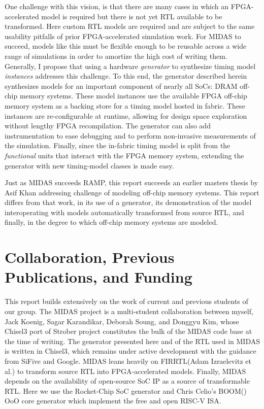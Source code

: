 One challenge with this vision, is that there are many cases in which an
FPGA-accelerated model is required but there is not yet RTL available to be
transformed. Here custom RTL models are required and are subject to the same
usability pitfalls of prior FPGA-accelerated simulation work. For MIDAS to
succeed, models like this must be flexible enough to be reusable across a wide
range of simulations in order to amortize the high cost of writing them.
Generally, I propose that using a hardware \emph{generator} to synthesize
timing model \emph{instances} addresses this challenge. To this end, the
generator described herein synthesizes models for an important component of
nearly all SoCs: DRAM off-chip memory systems. These model instances use the
available FPGA off-chip memory system as a backing store for a timing model
hosted in fabric. These instances are re-configurable at runtime, allowing for
design space exploration without lengthy FPGA recompilation. The generator can
also add instrumentation to ease debugging and to perform non-invasive
measurements of the simulation. Finally, since the in-fabric timing model is
split from the \emph{functional} units that interact with the FPGA memory
system, extending the generator with new timing-model classes is made easy.

Just as MIDAS succeeds RAMP, this report succeeds an earlier masters thesis by
Asif Khan\cite{khanmasters} addressing challenge of modeling off-chip memory
systems. This report differs from that work, in its use of a generator, its
demonstration of the model interoperating with models automatically transformed
from source RTL, and finally, in the degree to which off-chip memory systems
are modeled.

\section{Collaboration, Previous Publications, and Funding}

This report builds extensively on the work of current and previous students of
our group. The MIDAS project is a multi-student collaboration between myself,
Jack Koenig, Sagar Karandikar, Deborah Soung, and Donggyu Kim, whose Chisel3
port of Strober\cite{strober} project constitutes the bulk of the MIDAS code
base at the time of writing. The generator presented here and of the RTL used
in MIDAS is written in Chisel3\cite{chisel}, which remains under active
development with the guidance from SiFive and Google. MIDAS leans heavily on
FIRRTL\cite{firrtl}(Adam Izraelevitz et al.) to transform source RTL into
FPGA-accelerated models. Finally, MIDAS depends on the availability of
open-source SoC IP as a source of transformable RTL. Here we use the
Rocket-Chip\cite{rocketchip} SoC generator and Chris Celio's BOOM(\cite{boom})
OoO core generator which implement the free and open RISC-V ISA.

